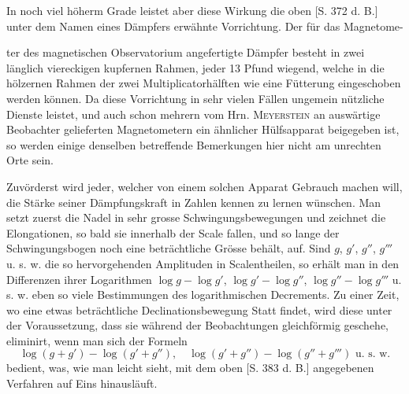 In noch viel höherm Grade leistet aber diese Wirkung die oben [S. 372 d. B.] unter dem Namen eines Dämpfers erwähnte Vorrichtung. Der für das Magnetome-
\par\clearpage
{}
\noindent ter des magnetischen Observatorium angefertigte Dämpfer besteht in zwei länglich viereckigen kupfernen Rahmen, jeder 13 Pfund wiegend, welche in die hölzernen Rahmen der zwei Multiplicatorhälften wie eine Fütterung eingeschoben werden können. Da diese Vorrichtung in sehr vielen Fällen ungemein nützliche Dienste leistet, und auch schon mehrern vom Hrn. \textsc{Meyerstein} an auswärtige Beobachter gelieferten Magnetometern ein ähnlicher Hülfsapparat beigegeben ist, so werden einige denselben betreffende Bemerkungen hier nicht am unrechten Orte sein.

Zuvörderst wird jeder, welcher von einem solchen Apparat Gebrauch machen will, die Stärke seiner Dämpfungskraft in Zahlen kennen zu lernen wünschen. Man setzt zuerst die Nadel in sehr grosse Schwingungsbewegungen und zeichnet die Elongationen, so bald sie innerhalb der Scale fallen, und so lange der Schwingungsbogen noch eine beträchtliche Grösse behält, auf. Sind $g$, $g'$, $g''$, $g'''$ u. s. w. die so hervorgehenden Amplituden in Scalentheilen, so erhält man in den Differenzen ihrer Logarithmen $\log g-\log g'$, $\log g'-\log g''$, $\log g''-\log g'''$ u. s. w. eben so viele Bestimmungen des logarithmischen Decrements. Zu einer Zeit, wo eine etwas beträchtliche Declinationsbewegung Statt findet, wird diese unter der Voraussetzung, dass sie während der Beobachtungen gleichförmig geschehe, eliminirt, wenn man sich der Formeln
\[
\log(g+g')-\log(g'+g''),\quad \log(g'+g'')-\log(g''+g''')\text{ u. s. w.}
\]
bedient, was, wie man leicht sieht, mit dem oben [S. 383 d. B.] angegebenen Verfahren auf Eins hinausläuft.

